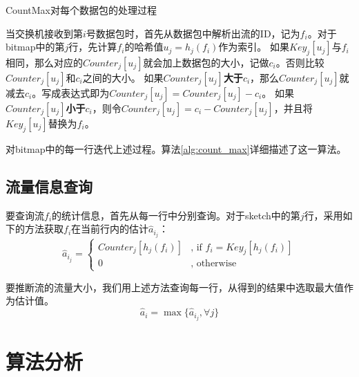 \begin{algorithm}[htb]
    \small
    \SetAlgoLined
  
    \caption{CountMax对每个数据包的处理过程}
    \label{alg:count_max}
\end{algorithm}
当交换机接收到第$i$号数据包时，首先从数据包中解析出流的ID，记为$f_i$。对于bitmap中的第$j$行，先计算$f_i$的哈希值$u_{j}=h_{j}(f_i)$作为索引。
如果$Key_{j}[u_{j}]$与$f_i$相同，那么对应的$Counter_{j}[u_{j}]$就会加上数据包的大小，记做$c_i$。否则比较$Counter_{j}[u_{j}]$和$c_i$之间的大小。
如果$Counter_{j}[u_{j}]$\textbf{大于}$c_i$，那么$Counter_{j}[u_{j}]$就减去$c_i$。写成表达式即为$Counter_{j}[u_{j}] = Counter_{j}[u_{j}] - c_i$。
如果$Counter_{j}[u_{j}]$\textbf{小于}$c_i$，则令$Counter_{j}[u_{j}]=c_i - Counter_{j}[u_{j}]$，并且将$Key_{j}[u_{j}]$替换为$f_i$。

对bitmap中的每一行迭代上述过程。算法\ref{alg:count_max}详细描述了这一算法。

\subsection{流量信息查询}
%
要查询流$f_i$的统计信息，首先从每一行中分别查询。对于sketch中的第$j$行，采用如下的方法获取$f_i$在当前行内的估计$\hat{a}_{i_{j}}$：
\begin{equation}
\hat{a}_{i_{j}}=\left\{
\begin{aligned}
Counter_{j}[h_j(f_i)]&\text{, if $f_i=Key_{j}[h_j(f_i)]$}\\
0&\text{, otherwise}
\end{aligned}
\right.
\end{equation}

要推断流的流量大小，我们用上述方法查询每一行，从得到的结果中选取最大值作为估计值。
\begin{equation}
\label{eq:query}
\hat{a}_{i}=\max{\{\hat{a}_{i_{j}} , \forall j\}}
\end{equation}

\section{算法分析}\label{sec:analysis}
\label{subsec:analysis}
%

